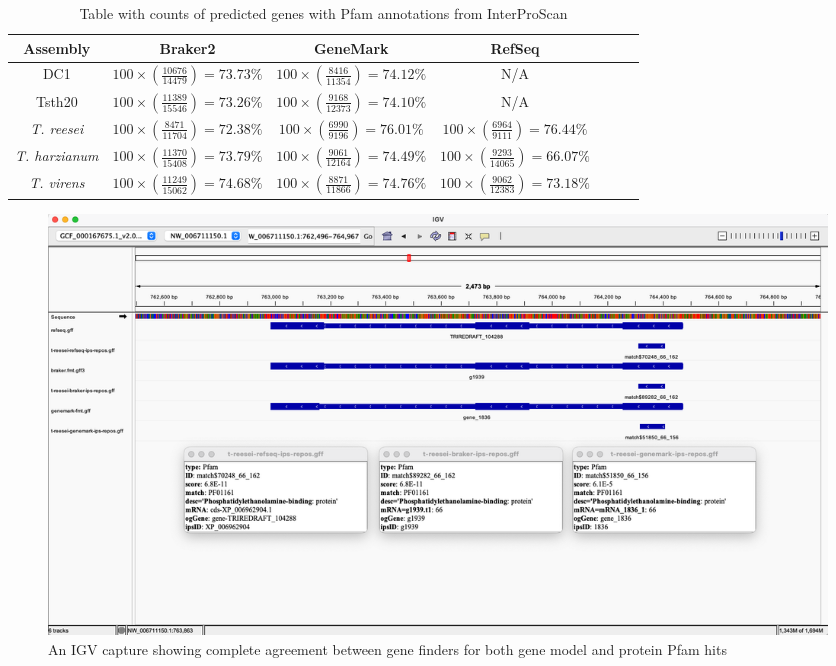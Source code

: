 \begin{table}[h!]
  \centering
  \begin{tabular}{|c|c|c|c|c|c|c|}
    \hline
    Assembly & Braker2 & GeneMark & RefSeq \\ \hline
    DC1 & $100\times(\frac{10676}{14479})=73.73\%$ & $100\times(\frac{8416}{11354})=74.12\%$ & N/A \\ \hline
    Tsth20 & $100\times(\frac{11389}{15546})=73.26\%$ & $100\times(\frac{9168}{12373})=74.10\%$ & N/A \\ \hline
    \textit{T. reesei} & $100\times(\frac{8471}{11704})=72.38\%$ & $100\times(\frac{6990}{9196})=76.01\%$ & $100\times(\frac{6964}{9111})=76.44\%$ \\ \hline
    \textit{T. harzianum} & $100\times(\frac{11370}{15408})=73.79\%$ & $100\times(\frac{9061}{12164})=74.49\%$ & $100\times(\frac{9293}{14065})=66.07\%$ \\ \hline
    \textit{T. virens} & $100\times(\frac{11249}{15062})=74.68\%$ & $100\times(\frac{8871}{11866})=74.76\%$ & $100\times(\frac{9062}{12383})=73.18\%$ \\ \hline
  \end{tabular}
  \caption[InterProScan Pfam Evidence]{Table with counts of predicted
    genes with Pfam annotations from InterProScan}
  \label{table:ips-pfam}
\end{table}


\begin{figure}[h!]
  \centering
  \includegraphics[width=\textwidth]{figures/igv/ips-basic-agree.png}
  \caption[Agreeing Pfam matches]{An IGV capture showing complete
    agreement between gene finders for both gene model and protein
    Pfam hits}
  \label{fig:basic-agree}
\end{figure}

